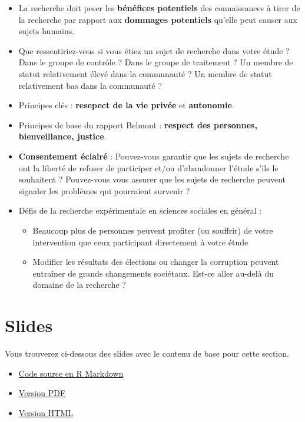 \documentclass[
  12pt,
]{book}
\begin{document}
\begin{itemize}
\item
  La recherche doit peser les \textbf{bénéfices potentiels} des connaissances à tirer de la recherche par rapport aux \textbf{dommages potentiels} qu'elle peut causer aux sujets humains.
\item
  Que ressentiriez-vous si vous étiez un sujet de recherche dans votre étude ? Dans le groupe de contrôle ? Dans le groupe de traitement ? Un membre de statut relativement élevé dans la communauté ? Un membre de statut relativement bas dans la communauté ?
\item
  Principes clés : \textbf{resepect de la vie privée} et \textbf{autonomie}.
\item
  Principes de base du rapport Belmont : \textbf{respect des personnes, bienveillance, justice}.
\item
  \textbf{Consentement éclairé} : Pouvez-vous garantir que les sujets de recherche ont la liberté de refuser de participer et/ou d'abandonner l'étude s'ils le souhaitent ? Pouvez-vous vous assurer que les sujets de recherche peuvent signaler les problèmes qui pourraient survenir ?
\item
  Défis de la recherche expérimentale en sciences sociales en général :

  \begin{itemize}
  \item
    Beaucoup plus de personnes peuvent profiter (ou souffrir) de votre intervention que ceux participant directement à votre étude
  \item
    Modifier les résultats des élections ou changer la corruption peuvent entraîner de grands changements sociétaux. Est-ce aller au-delà du domaine de la recherche ?
  \end{itemize}
\end{itemize}

\hypertarget{slides-8}{%
\section{Slides}\label{slides-8}}

Vous trouverez ci-dessous des slides avec le contenu de base pour cette section.

\begin{itemize}
\item
  \href{https://egap.github.io/learningdays-resources/Slides/ethics-slides.Rmd}{Code source en R Markdown}
\item
  \href{https://egap.github.io/learningdays-resources/Slides/ethics-slides.pdf}{Version PDF}
\item
  \href{https://egap.github.io/learningdays-resources/Slides/ethics-slides.html}{Version HTML}
\end{itemize}
\end{document}
